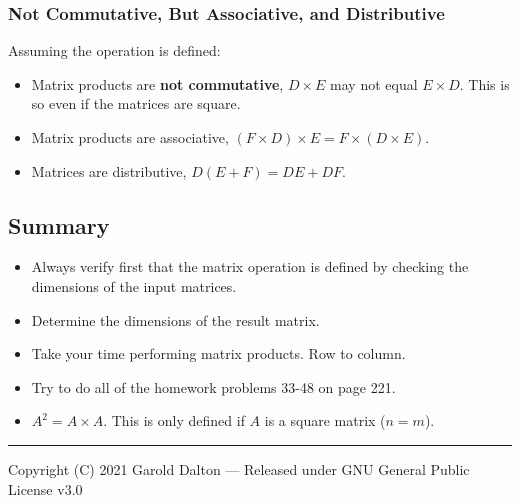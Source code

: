 \documentclass[14pt]{extarticle}
\begin{document}
\subsubsection*{Not Commutative,  But Associative, and Distributive}
Assuming the operation is defined:
\begin{itemize}
	\item Matrix products are \textbf{not commutative}, $D\times E$ may not equal $E\times D$. This is so even if the matrices are square.
	\item Matrix products are associative, $(F\times D) \times E = F\times (D\times E)$.
	\item Matrices are distributive, $D(E+F) = DE + DF$.
\end{itemize}

\subsection{Summary}
\begin{itemize}
	\item Always verify first that the matrix operation is defined by checking the dimensions of the input matrices.
	\item Determine the dimensions of the result matrix.
	\item Take your time performing matrix products. Row to column.
	\item Try to do all of the homework problems 33-48 on page 221.	
	\item $A^2=A\times A$. This is only defined if $A$ is a square matrix ($n=m$).
\end{itemize}

\noindent\rule{\textwidth}{1pt}
{\footnotesize Copyright (C) 2021 Garold Dalton --- Released under GNU General Public License v3.0}
\end{document}
